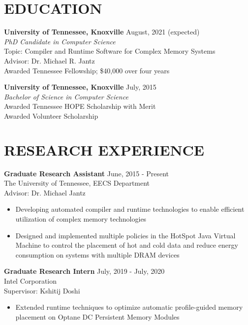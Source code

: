 \documentclass[margin,11pt]{res} %
\newlength\tindent
\begin{document}
\begin{resume}

\section{EDUCATION}
  {\textbf{University of Tennessee, Knoxville}} \hfill August, 2021 (expected) \\
    \textit{PhD Candidate in Computer Science} \\
    \hspace*{\tindent} Topic: Compiler and Runtime Software for Complex Memory Systems \\
    \hspace*{\tindent} Advisor: Dr. Michael R. Jantz \\
    \hspace*{\tindent} Awarded Tennessee Fellowship; \$40,000 over four years

  {\textbf{University of Tennessee, Knoxville}} \hfill July, 2015 \\
    \textit{Bachelor of Science in Computer Science} \\
    \hspace*{\tindent} Awarded Tennessee HOPE Scholarship with Merit \\
    \hspace*{\tindent} Awarded Volunteer Scholarship

\section{RESEARCH EXPERIENCE}

  {\textbf{Graduate Research Assistant}} \hfill June, 2015 - Present \\
   The University of Tennessee, EECS Department \\
   Advisor: Dr. Michael Jantz
    \begin{itemize} \itemsep -2pt
      \item Developing automated compiler and runtime technologies to enable
        efficient utilization of complex memory technologies
      \item Designed and implemented multiple policies in the HotSpot Java
        Virtual Machine to control the placement of hot and cold data and
        reduce energy consumption on systems with multiple DRAM devices
    \end{itemize}
    
  {\textbf{Graduate Research Intern}} \hfill July, 2019 - July, 2020 \\
   Intel Corporation \\
   Supervisor: Kshitij Doshi
    \begin{itemize} \itemsep -2pt
      \item Extended runtime techniques to optimize automatic profile-guided 
        memory placement on Optane DC Persistent Memory Modules
    \end{itemize}


\end{resume}
\end{document}
